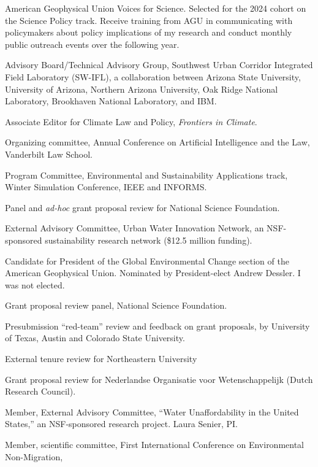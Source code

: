 \item[2024--2025] American Geophysical Union Voices for Science. Selected for
  the 2024 cohort on the Science Policy track. Receive training from AGU in
  communicating with policymakers about policy implications of my research and
  conduct monthly public outreach events over the following year.
\item[2023--2025] Advisory Board/Technical Advisory Group,
  Southwest Urban Corridor Integrated Field Laboratory (SW-IFL),
  a collaboration between Arizona State University, University of Arizona,
  Northern Arizona University, Oak Ridge National Laboratory,
  Brookhaven National Laboratory, and IBM.
\item[2021--present] Associate Editor for Climate Law and Policy,
   \emph{Frontiers in Climate}.
\item[2016--present] Organizing committee,
  Annual Conference on Artificial Intelligence and the Law,
  Vanderbilt Law School.
\item[2016--2023] Program Committee,
  Environmental and Sustainability Applications track,
  Winter Simulation Conference, IEEE and INFORMS.
\item[2023] Panel and \emph{ad-hoc\/} grant proposal review for National Science Foundation.
\item[2016--2021] External Advisory Committee,
  Urban Water Innovation Network, an NSF-sponsored sustainability
  research network (\$12.5 million funding).
\item[2022] Candidate for President of the Global Environmental Change
  section of the American Geophysical Union. Nominated by President-elect
  Andrew Dessler. I was not elected.
\item[2022] Grant proposal review panel, National Science Foundation.
\item[2022] Presubmission ``red-team'' review and feedback on grant proposals,
  by University of Texas, Austin and Colorado State University.
\item[2021] External tenure review for Northeastern University
\item[2021] Grant proposal review for Nederlandse Organisatie voor Wetenschappelijk
  (Dutch Research Council).
\item[2019--2021] Member, External Advisory Committee,
  ``Water Unaffordability in the United States,''
  an NSF-sponsored research project. Laura Senier, PI.
\item[2019] Member, scientific committee,
  First International Conference on Environmental Non-Migration,
